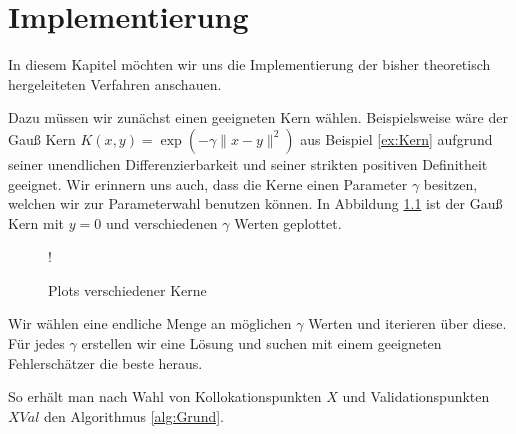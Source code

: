 \chapter{Implementierung}
\label{cha:Implementierung}

In diesem Kapitel möchten wir uns die Implementierung der bisher theoretisch hergeleiteten Verfahren anschauen.

Dazu müssen wir zunächst einen geeigneten Kern wählen. Beispielsweise wäre der Gauß Kern $K(x,y) = \exp\left(-\gamma \|x-y\|^2\right)$ aus Beispiel \ref{ex:Kern} aufgrund seiner unendlichen Differenzierbarkeit und seiner strikten positiven Definitheit geeignet. Wir erinnern uns auch, dass die Kerne einen Parameter $\gamma$ besitzen, welchen wir zur Parameterwahl benutzen können. In Abbildung \ref{fig:Kerne} ist der Gauß Kern mit $y= 0$ und verschiedenen $\gamma$ Werten geplottet.
\begin{figure}[ht]
\centering
\resizebox {.8\columnwidth} {!} {

}
\caption{Plots verschiedener Kerne}
\label{fig:Kerne}
\end{figure}
Wir wählen eine endliche Menge an möglichen $\gamma$ Werten und iterieren über diese. Für jedes $\gamma$ erstellen wir eine Lösung und suchen mit einem geeigneten Fehlerschätzer die beste heraus.

So erhält man nach Wahl von Kollokationspunkten $X$ und Validationspunkten $XVal$ den Algorithmus \ref{alg:Grund}.


